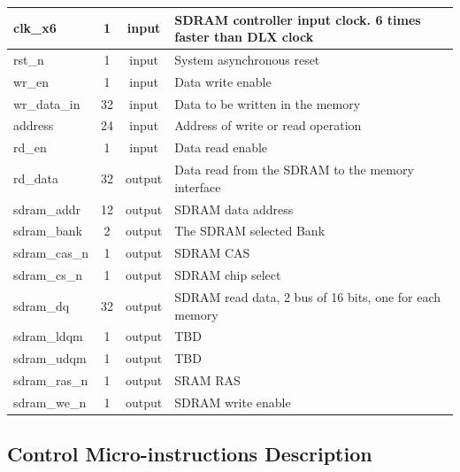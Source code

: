 \documentclass{article}
\begin{document}
\begin{center}
\begin{longtable}[pos]{| l | c | c | m{7cm} |}
        clk\_x6               & 1   & input  & SDRAM controller input clock. 6 times faster than DLX clock    \\ \hline
        rst\_n               & 1   & input  & System asynchronous reset    \\ \hline
        wr\_en           & 1  & input  & Data write enable \\ \hline
        wr\_data\_in           & 32  & input  & Data to be written in the memory \\ \hline
        address      & 24   & input  & Address of write or read operation \\ \hline
        rd\_en        & 1   & input  & Data read enable  \\ \hline
        rd\_data  & 32 & output  & Data read from the SDRAM to the memory interface \\ \hline
        sdram\_addr          & 12 & output  & SDRAM data address \\ \hline
        sdram\_bank        & 2   & output & The SDRAM selected Bank  \\ \hline
        sdram\_cas\_n           & 1  & output & SDRAM CAS  \\ \hline
        sdram\_cs\_n    & 1  & output  & SDRAM chip select  \\ \hline
        sdram\_dq    & 32  & output  & SDRAM read data, 2 bus of 16 bits, one for each memory  \\ \hline
        sdram\_ldqm    & 1  & output  & TBD  \\ \hline
        sdram\_udqm    & 1  & output  & TBD  \\ \hline
        sdram\_ras\_n    & 1  & output  & SRAM RAS  \\ \hline
        sdram\_we\_n    & 1  & output  & SDRAM write enable  \\ \hline
      \end{longtable}
    \end{center} 


\newpage  
  \subsection{Control Micro-instructions Description}
\end{document}
